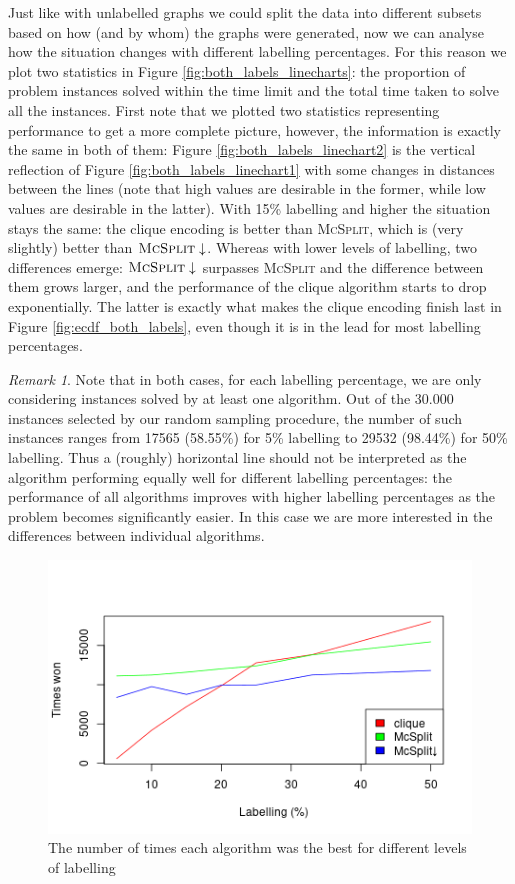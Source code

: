 \documentclass{l4proj}
\theoremstyle{definition}
\theoremstyle{remark}
\newtheorem{remark}{Remark}[chapter]
\begin{document}
Just like with unlabelled graphs we could split the data into different subsets
based on how (and by whom) the graphs were generated, now we can analyse how the
situation changes with different labelling percentages. For this reason we plot
two statistics in Figure \ref{fig:both_labels_linecharts}: the proportion of
problem instances solved within the time limit and the total time taken to solve
all the instances. First note that we plotted two statistics representing
performance to get a more complete picture, however, the information is exactly
the same in both of them: Figure \ref{fig:both_labels_linechart2} is the vertical
reflection of Figure \ref{fig:both_labels_linechart1} with some changes in distances
between the lines (note that high values are desirable in the former, while low
values are desirable in the latter). With 15\% labelling and higher the
situation stays the same: the clique encoding is better than \textsc{McSplit},
which is (very slightly) better than $\textsc{McSplit}\downarrow$. Whereas with
lower levels of labelling, two differences emerge: $\textsc{McSplit}\downarrow$
surpasses \textsc{McSplit} and the difference between them grows larger, and the
performance of the clique algorithm starts to drop exponentially. The latter is
exactly what makes the clique encoding finish last in Figure
\ref{fig:ecdf_both_labels}, even though it is in the lead for most labelling
percentages.

\begin{remark}
Note that in both cases, for each labelling percentage, we are only considering
instances solved by at least one algorithm. Out of the \num{30,000} instances
selected by our random sampling procedure, the number of such instances ranges
from \num{17565} (58.55\%) for 5\% labelling to \num{29532} (98.44\%) for 50\%
labelling. Thus a (roughly) horizontal line should not be interpreted as the
algorithm performing equally well for different labelling percentages: the
performance of all algorithms improves with higher labelling percentages as the
problem becomes significantly easier. In this case we are more interested in the
differences between individual algorithms.
\end{remark}

\begin{figure}
  \centering
  \includegraphics[scale=0.7]{images/both_labels_linechart3.png}
  \caption{The number of times each algorithm was the best for different levels
    of labelling}
  \label{fig:both_labels_linechart3}
\end{figure}
\end{document}
